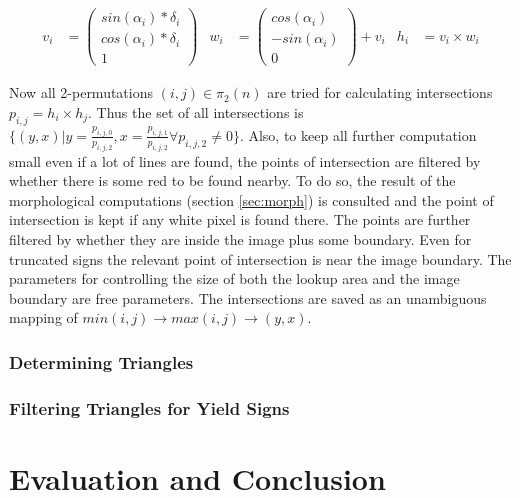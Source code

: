 \documentclass{report}
\begin{document}
\begin{align}\label{eq:poi}
  v_i & = \begin{pmatrix}
    sin(\alpha_i) * \delta_i \\ cos(\alpha_i) * \delta_i \\ 1
  \end{pmatrix}
  &
  w_i & = \begin{pmatrix}
    cos(\alpha_i) \\ -sin(\alpha_i) \\ 0
  \end{pmatrix} + v_i
  &
  h_i & = v_i \times w_i
\end{align}

Now all 2-permutations \( (i, j) \in \pi_2(n) \) are tried for
calculating intersections \( p_{i,j} = h_i \times h_j \). Thus the set
of all intersections is \(\{ (y, x) | y = \frac{p_{i, j, 0}}{p_{i, j,
    2}}, x = \frac{p_{i, j, 1}}{p_{i, j, 2}} \forall p_{i, j, 2} \neq
0 \}\). Also, to keep all further computation small even if a lot of
lines are found, the points of intersection are filtered by whether
there is some red to be found nearby. To do so, the result of the
morphological computations (section \ref{sec:morph}) is consulted and
the point of intersection is kept if any white pixel is found
there. The points are further filtered by whether they are inside the
image plus some boundary. Even for truncated signs the relevant point
of intersection is near the image boundary. The parameters for
controlling the size of both the lookup area and the image boundary
are free parameters. The intersections are saved as an unambiguous
mapping of \( min(i, j) \to max(i, j) \to (y, x) \).


\subsection{Determining Triangles}





\subsection{Filtering Triangles for Yield Signs}
{\color{red}{To be written}}


\pagebreak
\chapter{Evaluation and Conclusion}
\end{document}

